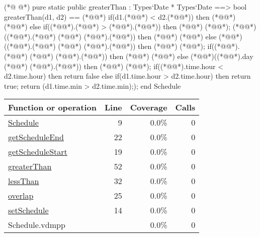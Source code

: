 \begin{vdmpp}[breaklines=true]
(*@
\label{greaterThan:52}
@*)
 pure static public greaterThan : Types`Date * Types`Date ==> bool
  greaterThan(d1, d2) == (*@\vdmnotcovered{(}@*)
          if(d1.(*@@*) < d2.(*@@*))
           then (*@@*) (*@@*)
          else if((*@@*).(*@@*) > (*@@*).(*@@*))
           then (*@@*) (*@@*);
          (*@@*)((*@@*).(*@@*) (*@\vdmnotcovered{<}@*) (*@@*).(*@@*))
           then (*@@*) (*@@*)
          else (*@@*)((*@@*).(*@@*) (*@\vdmnotcovered{>}@*) (*@@*).(*@@*))
           then (*@@*) (*@@*);
          if((*@@*).(*@@*) (*@\vdmnotcovered{<}@*) (*@@*).(*@@*))
           then (*@@*) (*@@*)
          else (*@@*)((*@@*).day (*@\vdmnotcovered{>}@*) (*@@*).(*@@*))
           then (*@@*) (*@@*);
          if((*@@*).time.hour < d2.time.hour)
           then return false
          else if(d1.time.hour > d2.time.hour)
           then return true;
          return (d1.time.min > d2.time.min););
end Schedule
\end{vdmpp}
\bigskip
\begin{longtable}{|l|r|r|r|}
\hline
Function or operation & Line & Coverage & Calls \\
\hline
\hline
\hyperref[Schedule:9]{Schedule} & 9&0.0\% & 0 \\
\hline
\hyperref[getScheduleEnd:22]{getScheduleEnd} & 22&0.0\% & 0 \\
\hline
\hyperref[getScheduleStart:19]{getScheduleStart} & 19&0.0\% & 0 \\
\hline
\hyperref[greaterThan:52]{greaterThan} & 52&0.0\% & 0 \\
\hline
\hyperref[lessThan:32]{lessThan} & 32&0.0\% & 0 \\
\hline
\hyperref[overlap:25]{overlap} & 25&0.0\% & 0 \\
\hline
\hyperref[setSchedule:14]{setSchedule} & 14&0.0\% & 0 \\
\hline
\hline
Schedule.vdmpp & & 0.0\% & 0 \\
\hline
\end{longtable}

